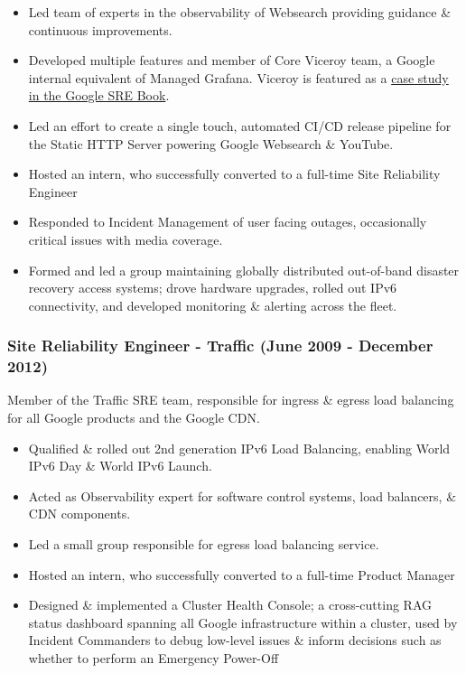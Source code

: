 \documentclass[a4paper, 10pt] {article}
\begin{document}
\begin{itemize}[noitemsep]
	\item Led team of experts in the observability of Websearch providing guidance \& continuous improvements.
	\item Developed multiple features and member of Core Viceroy team, a Google internal equivalent of Managed Grafana.
		Viceroy is featured as a \href{https://sre.google/sre-book/communication-and-collaboration/\#case-study-of-collaboration-in-sre-viceroy-ZKsVCZ}{case study in the Google SRE Book}.
  	\item Led an effort to create a single touch, automated CI/CD release pipeline for the Static HTTP Server powering Google Websearch \& YouTube.
   	\item Hosted an intern, who successfully converted to a full-time Site Reliability Engineer
	\item Responded to Incident Management of user facing outages, occasionally critical issues with media coverage.
	\item Formed and led a group maintaining globally distributed out-of-band disaster recovery access systems; drove hardware upgrades, rolled out IPv6 connectivity, and developed monitoring \& alerting across the fleet.
\end{itemize}

\subsubsection*{Site Reliability Engineer - Traffic (June 2009 - December 2012)}

Member of the Traffic SRE team, responsible for ingress \& egress load
balancing for all Google products and the Google CDN. 

\begin{itemize}[noitemsep]
  \item Qualified \& rolled out 2nd generation IPv6 Load Balancing, enabling World IPv6 Day \& World IPv6 Launch.
	\item Acted as Observability expert for software control systems, load balancers, \& CDN components.
 	\item Led a small group responsible for egress load balancing service.
 	\item Hosted an intern, who successfully converted to a full-time Product Manager
	\item Designed \& implemented a Cluster Health Console; a cross-cutting RAG status dashboard spanning all Google infrastructure
	    within a cluster, used by Incident Commanders to debug low-level issues \& inform decisions such as whether to perform an Emergency Power-Off
\end{itemize}
\end{document}
